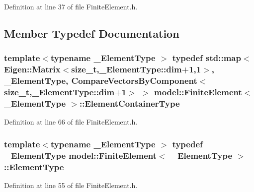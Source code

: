 Definition at line 37 of file Finite\+Element.\+h.



\subsection{Member Typedef Documentation}
\hypertarget{classmodel_1_1_finite_element_a958802e8fa024898a657ebbe942ef0ba}{}
\subsubsection[{Element\+Container\+Type}]{\setlength{\rightskip}{0pt plus 5cm}template$<$typename \+\_\+\+Element\+Type $>$ typedef std\+::map$<$Eigen\+::\+Matrix$<$size\+\_\+t,{\bf \+\_\+\+Element\+Type\+::dim}+1,1$>$, \+\_\+\+Element\+Type, {\bf Compare\+Vectors\+By\+Component}$<$size\+\_\+t,{\bf \+\_\+\+Element\+Type\+::dim}+1$>$ $>$ {\bf model\+::\+Finite\+Element}$<$ \+\_\+\+Element\+Type $>$\+::{\bf Element\+Container\+Type}}\label{classmodel_1_1_finite_element_a958802e8fa024898a657ebbe942ef0ba}


Definition at line 66 of file Finite\+Element.\+h.

\hypertarget{classmodel_1_1_finite_element_ac75db3a0b957c14015dfa8f17ce5b4ac}{}
\subsubsection[{Element\+Type}]{\setlength{\rightskip}{0pt plus 5cm}template$<$typename \+\_\+\+Element\+Type $>$ typedef \+\_\+\+Element\+Type {\bf model\+::\+Finite\+Element}$<$ \+\_\+\+Element\+Type $>$\+::{\bf Element\+Type}}\label{classmodel_1_1_finite_element_ac75db3a0b957c14015dfa8f17ce5b4ac}


Definition at line 55 of file Finite\+Element.\+h.

\hypertarget{classmodel_1_1_finite_element_a52dc23d4d24a1a38ff0f90d5708c02a8}{}
